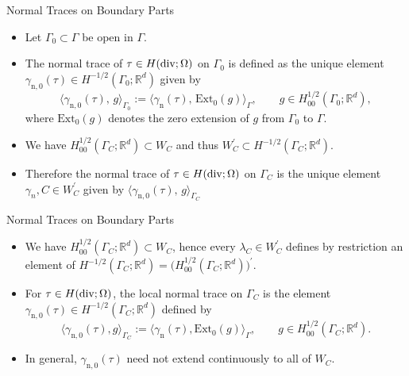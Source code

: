 \documentclass[10pt,aspectratio=169]{beamer}
\def\R{{\mathbb R}}
\newcommand{\diver}{\operatornamewithlimits{div}}
\begin{document}
\begin{frame}{Normal Traces on Boundary Parts}
	\begin{itemize}
		\item Let $\Gamma_0\subset\Gamma$ be open in $\Gamma$.
		\item The normal trace of $\tau\in H(\diver;\Omega)$ on $\Gamma_0$ is defined as the unique element $\gamma_{\mathrm{n},0}(\tau)\in H^{-1/2}(\Gamma_0;\R^d)$ given by
		      \begin{equation*}
			      \langle \gamma_{\mathrm{n},0}(\tau),\,g\rangle_{\Gamma_0}
			      :=
			      \langle \gamma_{\mathrm{n}}(\tau),\,\mathrm{Ext}_0 (g)\rangle_{\Gamma},
			      \qquad g\in H^{1/2}_{00}(\Gamma_0;\R^d),
		      \end{equation*}
		      where $\mathrm{Ext}_0 (g)$ denotes the zero extension of $g$ from $\Gamma_0$ to $\Gamma$.
		\item We have $H^{1/2}_{00}(\Gamma_C;\R^d)\subset W_C$ and thus $W_C^\prime\subset H^{-1/2}(\Gamma_C;\R^d)$.
		\item Therefore the normal trace of $\tau\in H(\diver;\Omega)$ on $\Gamma_C$ is the unique element $\gamma_n,C\in W_C^\prime$ given by $\langle \gamma_{\mathrm{n},0}(\tau),\,g\rangle_{\Gamma_C}$
	\end{itemize}
\end{frame}

\begin{frame}{Normal Traces on Boundary Parts}
	\begin{itemize}
		\item We have $H^{1/2}_{00}(\Gamma_C;\R^d)\subset W_C$, hence every
		      $\lambda_C\in W_C^\prime$ defines by restriction an element of
		      $H^{-1/2}(\Gamma_C;\R^d)=\big(H^{1/2}_{00}(\Gamma_C;\R^d)\big)^\prime$.
		\item For $\tau\in H(\diver;\Omega)$, the local normal trace on $\Gamma_C$ is
		      the element $\gamma_{\mathrm{n},0}(\tau)\in H^{-1/2}(\Gamma_C;\R^d)$
		      defined by
		      \begin{equation*}
			      \langle \gamma_{\mathrm{n},0}(\tau),g\rangle_{\Gamma_C}
			      :=
			      \langle \gamma_{\mathrm n}(\tau),\mathrm{Ext}_0(g)\rangle_\Gamma,
			      \qquad
			      g\in H^{1/2}_{00}(\Gamma_C;\R^d).
		      \end{equation*}
		\item In general, $\gamma_{\mathrm{n},0}(\tau)$ need not extend continuously to
		      all of $W_C$.
	\end{itemize}
\end{frame}
\end{document}
